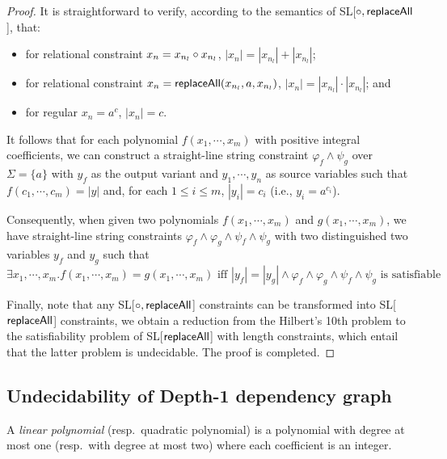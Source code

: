 \begin{proof}
{		It is straightforward to verify, according to the semantics of SL[$\circ, \mathsf{replaceAll}$], that:
		\begin{itemize}
			\item for relational constraint $x_n= x_{n_l}\circ x_{n_l}$, $|x_n|= |x_{n_l}|+|x_{n_l}|$; 
			\item for relational constraint $x_n= \mathsf{replaceAll}(x_{n_l}, a, x_{n_l})$,  $|x_n|= |x_{n_l}|\cdot |x_{n_l}|$; and 
			\item for regular $x_n=a^c$, $|x_n|=c$. 
		\end{itemize}
		
		It follows that for each polynomial $f(x_1, \cdots, x_m)$ with positive integral coefficients, we can construct a straight-line string constraint $\varphi_{f}\wedge\psi_g$ over $\Sigma=\{a\}$ with $y_f$ as the output variant and $y_1, \cdots, y_n$ as source variables such that
		$f(c_1, \cdots, c_m)=|y|$ and, for each $1\leq i\leq m$, $|y_i|= c_i$ (i.e., $y_i=a^{c_i}$).  
		
		Consequently, when given two polynomials $f(x_1, \cdots, x_m)$ and $g(x_1, \cdots, x_m)$, we have straight-line string constraints $\varphi_{f}\wedge \varphi_{g}\wedge \psi_{f}\wedge \psi_g$ with two distinguished two variables  $y_f$ and $y_g$ such that  
		\[\exists x_1, \cdots, x_m. f(x_1, \cdots, x_m)=g(x_1, \cdots, x_m)\mbox{ iff } |y_f|=|y_g|\wedge \varphi_{f}\wedge \varphi_{g}\wedge \psi_{f}\wedge \psi_g\mbox{ is satisfiable} \]
		
		Finally, note that any  SL[$\circ, \mathsf{replaceAll}$] constraints can be transformed into SL[$\mathsf{replaceAll}$] constraints, we obtain a reduction from the Hilbert's 10th problem to the satisfiability problem of  SL[$\mathsf{replaceAll}$] with length constraints, which entail that the latter problem is undecidable. The proof is completed. 
	}
\end{proof}

\subsection{Undecidability of Depth-1 dependency graph}

A \emph{linear polynomial} (resp.\ quadratic polynomial) is a polynomial with degree at most one (resp.\ with degree at most two) where each coefficient is an integer. %

